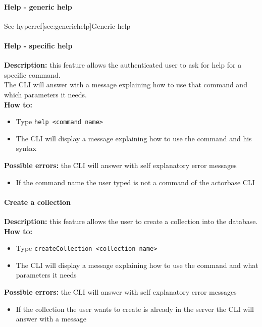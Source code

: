 \documentclass{scalatekids-article}
\begin{document}
\paragraph{Help - generic help}

See hyperref[sec:generichelp]{Generic help}

\paragraph{Help - specific help}
\label{sec:specifichelp}
\textbf{Description:} this feature allows the authenticated user to ask for help for 
a specific command.\\
The CLI will answer with a message explaining how to use that command and 
which parameters it needs.\\
\textbf{How to:} 
\begin{itemize}
	\item Type \texttt{help <command name>}
	\item The CLI will display a message explaining how to use the command and his syntax
\end{itemize}
\textbf{Possible errors:} the CLI will answer with self explanatory error messages 
\begin{itemize}
	\item If the command name the user typed is not a command of the actorbase CLI
\end{itemize}

\paragraph{Create a collection}
\label{sec:createcollection}
\textbf{Description:} this feature allows the user to create a 
collection into the database.\\
\textbf{How to:} 
\begin{itemize}
	\item Type \texttt{createCollection <collection name>}
	\item The CLI will display a message explaining how to use the command and what parameters it needs
\end{itemize}
\textbf{Possible errors:} the CLI will answer with self explanatory error messages 
\begin{itemize}
	\item If the collection the user wants to create is already in the server the CLI will answer with a message
\end{itemize}
\end{document}
